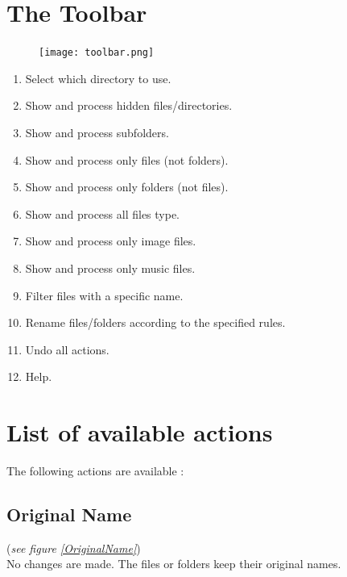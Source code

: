 \documentclass[10pt, a4paper]{scrartcl}
\begin{document}
\section{The Toolbar}
\begin{figure}[!ht]
        \centering
        \texttt{[image: toolbar.png]}
        \label{toolbar}
\end{figure}
\begin{enumerate}
        \item Select which directory to use.
        \item Show and process hidden files/directories.
        \item Show and process subfolders.
        \item Show and process only files (not folders).
        \item Show and process only folders (not files).
        \item Show and process all files type.
        \item Show and process only image files.
        \item Show and process only music files.
        \item Filter files with a specific name.
        \item Rename files/folders according to the specified rules.
        \item Undo all actions.
        \item Help.
\end{enumerate}

\section{List of available actions}
The following actions are available :

\subsection*{Original Name}
(\emph{see figure \ref{OriginalName}})\\
No changes are made. The files or folders keep their original names.
\end{document}
